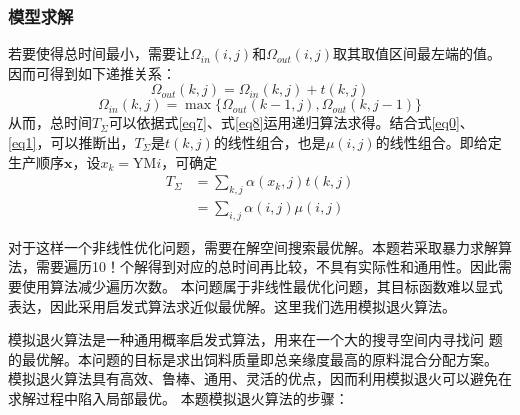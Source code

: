 \documentclass[UTF8]{ctexart}
\begin{document}
	
	\subsubsection{模型求解}
	若要使得总时间最小，需要让$\Omega_{in}(i,j)$和$\Omega_{out}(i,j)$取其取值区间最左端的值。因而可得到如下递推关系：
	\begin{equation}
		\Omega_{out}(k,j)=\Omega_{in}(k,j)+t(k,j)
		\label{eq7}
	\end{equation}
	\begin{equation}
		\Omega_{in}(k,j)=\max\{\Omega_{out}(k-1,j),\Omega_{out}(k,j-1)\}
		\label{eq8}
	\end{equation}
	从而，总时间$T_{\Sigma}$可以依据式\ref{eq7}、式\ref{eq8}运用递归算法求得。结合式\ref{eq0}、\ref{eq1}，可以推断出，$T_{\Sigma}$是$t(k,j)$的线性组合，也是$\mu(i,j)$的线性组合。即给定生产顺序$\boldsymbol{x}$，设$x_{k}=$YM$i$，可确定
	\begin{equation}
	\begin{split}
		T_{\Sigma}&=\sum_{k,j}\alpha(x_{k},j)t(k,j)\\
		&=\sum_{i,j}\alpha(i,j)\mu(i,j)
		\label{linear}
	\end{split}
	\end{equation}
	\par 对于这样一个非线性优化问题，需要在解空间搜索最优解。本题若采取暴力求解算法，需要遍历10！个解得到对应的总时间再比较，不具有实际性和通用性。因此需要使用算法减少遍历次数。
	本问题属于非线性最优化问题，其目标函数难以显式表达，因此采用启发式算法求近似最优解。这里我们选用模拟退火算法。 
	\par 模拟退火算法是一种通用概率启发式算法，用来在一个大的搜寻空间内寻找问 题的最优解。本问题的目标是求出饲料质量即总亲缘度最高的原料混合分配方案。 模拟退火算法具有高效、鲁棒、通用、灵活的优点，因而利用模拟退火可以避免在 求解过程中陷入局部最优。
	本题模拟退火算法的步骤：
\end{document}
